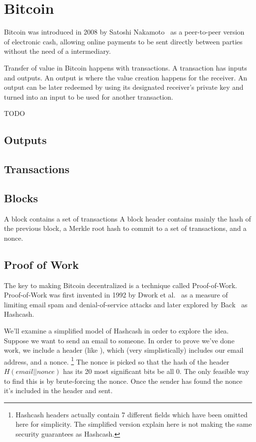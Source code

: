 \section{Bitcoin}
Bitcoin was introduced in 2008 by Satoshi Nakamoto~\cite{bitcoin} as a peer-to-peer version of electronic cash, allowing online payments to be sent directly between parties without the need of a intermediary.

Transfer of value in Bitcoin happens with transactions. A transaction has inputs and outputs. An output is where the value creation happens for the receiver. An output can be later redeemed by using its designated receiver's private key and turned into an input to be used for another transaction.

TODO

\subsection{Outputs}
\subsection{Transactions}
\subsection{Blocks}
A block contains a set of transactions
A block header contains mainly the hash of the previous block, a Merkle root hash to commit to a set of transactions, and a nonce.

\subsection{Proof of Work}
The key to making Bitcoin decentralized is a technique called Proof-of-Work. Proof-of-Work was first invented in 1992 by Dwork et al.~\cite{dwork} as a measure of limiting email spam and denial-of-service attacks and later explored by Back~\cite{hashcash} as Hashcash.

We'll examine a simplified model of Hashcash in order to explore the idea. Suppose we want to send an email to someone. In order to prove we've done work, we include a header (like ), which (very simplistically) includes our email address, and a nonce.
\footnote{Hashcash headers actually contain 7 different fields which have been omitted here for simplicity. The simplified version explain here is not making the same security guarantees as Hashcash.}
The nonce is picked so that the hash of the header $H(email || nonce)$ has its 20 most significant bits be all 0. The only feasible way to find this is by brute-forcing the nonce. Once the sender has found the nonce it's included in the header and sent.

